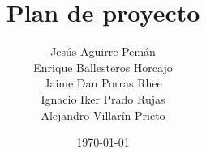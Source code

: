 \documentclass[spanish,a4paper,12pt]{report}		%
\begin{document}
\title{\textbf{\huge{Plan de proyecto}}}
\author{ Jesús Aguirre Pemán \\
	 Enrique Ballesteros Horcajo \\
	 Jaime Dan Porras Rhee \\
	 Ignacio Iker Prado Rujas \\
	 Alejandro Villarín Prieto }
\date{\today}
\maketitle

\newpage
\mbox{}
\thispagestyle{empty}


\tableofcontents 		%

\newpage
\mbox{}
\thispagestyle{empty}
\newpage
\end{document}
